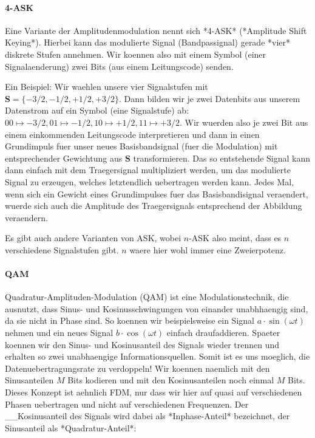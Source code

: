 \paragraph{ 4-ASK}

Eine Variante der Amplitudenmodulation nennt sich *4-ASK* (*Amplitude Shift
Keying*). Hierbei kann das modulierte Signal (Bandpassignal) gerade *vier*
diskrete Stufen annehmen. Wir koennen also mit einem Symbol (einer
Signalaenderung) zwei Bits (aus einem Leitungscode) senden.

Ein Beispiel: Wir waehlen unsere vier Signalstufen mit $\mathbf{S} = \{-3/2, -1/2, +1/2, +3/2\}$. Dann bilden wir je zwei Datenbits aus unserem Datenstrom auf ein Symbol (eine Signalstufe) ab: $00 \mapsto -3/2, 01 \mapsto -1/2, 10 \mapsto +1/2, 11 \mapsto +3/2$. Wir wuerden also je zwei Bit aus einem einkommenden Leitungscode interpretieren und dann in einen Grundimpuls fuer unser neues Basisbandsignal (fuer die Modulation) mit entsprechender Gewichtung aus $\mathbf{S}$ transformieren. Das so entstehende Signal kann dann einfach mit dem Traegersignal multipliziert werden, um das modulierte Signal zu erzeugen, welches letztendlich uebertragen werden kann. Jedes Mal, wenn sich ein Gewicht eines Grundimpulses fuer das Basisbandisignal veraendert, wuerde sich auch die Amplitude des Traegersignals entsprechend der Abbildung veraendern.

Es gibt auch andere Varianten von ASK, wobei $n$-ASK also meint, dass es $n$ verschiedene Signalstufen gibt. $n$ waere hier wohl immer eine Zweierpotenz.

\paragraph{ QAM}

Quadratur-Amplituden-Modulation (QAM) ist eine Modulationstechnik, die
ausnutzt, dass Sinus- und Kosinusschwingungen von einander unabhhaengig sind, da
sie nicht in Phase sind. So koennen wir beispielsweise ein Signal $a \cdot
\sin(\omega t)$ nehmen und ein neues Signal $b \cdot \cos(\omega t)$ einfach
draufaddieren. Spaeter koennen wir den Sinus- und Kosinusanteil des Signals
wieder trennen und erhalten so zwei unabhaengige Informationsquellen. Somit ist
es uns moeglich, die Datenuebertragungsrate zu verdoppeln! Wir koennen naemlich
mit den Sinusanteilen $M$ Bits kodieren und mit den Kosinusanteilen noch einmal
$M$ Bits. Dieses Konzept ist aehnlich FDM, nur dass wir hier auf quasi auf
verschiedenen Phasen uebertragen und nicht auf verschiedenen Frequenzen. Der
\_\_Kosinusanteil des Signals wird dabei als *Inphase-Anteil* bezeichnet, der
Sinusanteil als *Quadratur-Anteil*:

